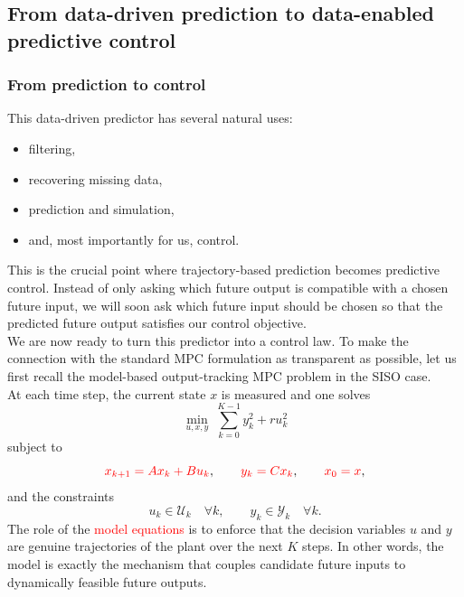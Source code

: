 \subsection{From data-driven prediction to data-enabled predictive control}
\subsubsection{From prediction to control}
This data-driven predictor has several natural uses:
\begin{itemize}
    \item filtering,
    \item recovering missing data,
    \item prediction and simulation,
    \item and, most importantly for us, control.
\end{itemize}
This is the crucial point where trajectory-based prediction becomes predictive control. Instead of only asking which future output is compatible with a chosen future input, we will soon ask which future input should be chosen so that the predicted future output satisfies our control objective.\\

We are now ready to turn this predictor into a control law. To make the connection with the standard MPC formulation as transparent as possible, let us first recall the model-based output-tracking MPC problem in the SISO case.\\
At each time step, the current state \(x\) is measured and one solves
\[
\min_{u,x,y}\;\sum_{k=0}^{K-1} y_k^2 + r u_k^2
\]
subject to
\[
\textcolor{red}{x_{k+1}=Ax_k+Bu_k},
\qquad
\textcolor{red}{y_k=Cx_k},
\qquad
\textcolor{red}{x_0=x},
\]
and the constraints
\[
u_k\in\mathcal{U}_k \quad \forall k,
\qquad
y_k\in\mathcal{Y}_k \quad \forall k.
\]
The role of the \textcolor{red}{model equations} is to enforce that the decision variables \(u\) and \(y\) are genuine trajectories of the plant over the next \(K\) steps. In other words, the model is exactly the mechanism that couples candidate future inputs to dynamically feasible future outputs.\\
